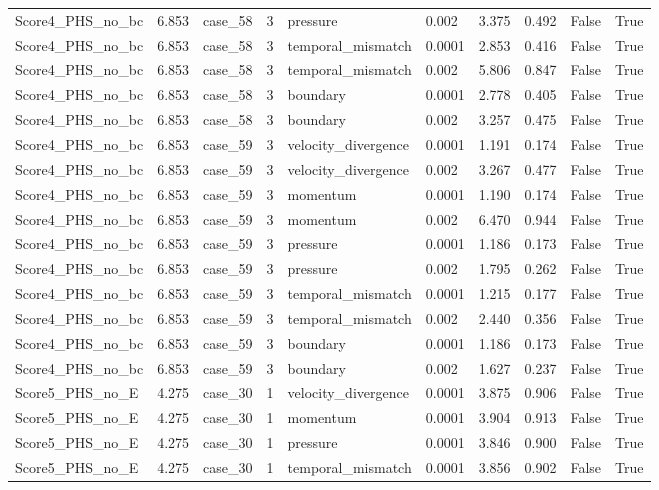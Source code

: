 \begin{longtable}{llllllllll}
Score4\_PHS\_no\_bc & 6.853 & case\_58 & 3 & pressure & 0.002 & 3.375 & 0.492 & False & True \\
Score4\_PHS\_no\_bc & 6.853 & case\_58 & 3 & temporal\_mismatch & 0.0001 & 2.853 & 0.416 & False & True \\
Score4\_PHS\_no\_bc & 6.853 & case\_58 & 3 & temporal\_mismatch & 0.002 & 5.806 & 0.847 & False & True \\
Score4\_PHS\_no\_bc & 6.853 & case\_58 & 3 & boundary & 0.0001 & 2.778 & 0.405 & False & True \\
Score4\_PHS\_no\_bc & 6.853 & case\_58 & 3 & boundary & 0.002 & 3.257 & 0.475 & False & True \\
Score4\_PHS\_no\_bc & 6.853 & case\_59 & 3 & velocity\_divergence & 0.0001 & 1.191 & 0.174 & False & True \\
Score4\_PHS\_no\_bc & 6.853 & case\_59 & 3 & velocity\_divergence & 0.002 & 3.267 & 0.477 & False & True \\
Score4\_PHS\_no\_bc & 6.853 & case\_59 & 3 & momentum & 0.0001 & 1.190 & 0.174 & False & True \\
Score4\_PHS\_no\_bc & 6.853 & case\_59 & 3 & momentum & 0.002 & 6.470 & 0.944 & False & True \\
Score4\_PHS\_no\_bc & 6.853 & case\_59 & 3 & pressure & 0.0001 & 1.186 & 0.173 & False & True \\
Score4\_PHS\_no\_bc & 6.853 & case\_59 & 3 & pressure & 0.002 & 1.795 & 0.262 & False & True \\
Score4\_PHS\_no\_bc & 6.853 & case\_59 & 3 & temporal\_mismatch & 0.0001 & 1.215 & 0.177 & False & True \\
Score4\_PHS\_no\_bc & 6.853 & case\_59 & 3 & temporal\_mismatch & 0.002 & 2.440 & 0.356 & False & True \\
Score4\_PHS\_no\_bc & 6.853 & case\_59 & 3 & boundary & 0.0001 & 1.186 & 0.173 & False & True \\
Score4\_PHS\_no\_bc & 6.853 & case\_59 & 3 & boundary & 0.002 & 1.627 & 0.237 & False & True \\
Score5\_PHS\_no\_E & 4.275 & case\_30 & 1 & velocity\_divergence & 0.0001 & 3.875 & 0.906 & False & True \\
Score5\_PHS\_no\_E & 4.275 & case\_30 & 1 & momentum & 0.0001 & 3.904 & 0.913 & False & True \\
Score5\_PHS\_no\_E & 4.275 & case\_30 & 1 & pressure & 0.0001 & 3.846 & 0.900 & False & True \\
Score5\_PHS\_no\_E & 4.275 & case\_30 & 1 & temporal\_mismatch & 0.0001 & 3.856 & 0.902 & False & True \\

\end{longtable}
